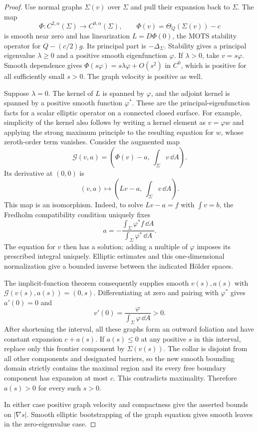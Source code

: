 \begin{proof}
Use normal graphs $\Sigma(v)$ over $\Sigma$ and pull their expansion
back to $\Sigma$.  The map
\[
 \Phi:C^{2,\alpha}(\Sigma)\longrightarrow C^{0,\alpha}(\Sigma),
 \qquad
 \Phi(v)=\Theta_Q(\Sigma(v))-c
\]
is smooth near zero and has linearization $L=D\Phi(0)$, the MOTS
stability operator for $Q-(c/2)g$.  Its principal part is
$-\Delta_\Sigma$.  Stability gives a principal eigenvalue
$\lambda\geq0$ and a positive smooth eigenfunction $\varphi$.
If $\lambda>0$, take $v=s\varphi$.  Smooth dependence gives
$\Phi(s\varphi)=s\lambda\varphi+O(s^2)$ in $C^0$, which is
positive for all sufficiently small $s>0$.  The graph velocity is
positive as well.

Suppose $\lambda=0$.  The kernel of $L$ is spanned by $\varphi$,
and the adjoint kernel is spanned by a positive smooth function
$\varphi^*$.  These are the principal-eigenfunction facts for a
scalar elliptic operator on a connected closed surface.  For
example, simplicity of the kernel also follows by writing a kernel
element as $v=\varphi w$ and applying the strong maximum principle
to the resulting equation for $w$, whose zeroth-order term vanishes.
Consider the augmented map
\[
 \mathcal G(v,a)
   =\left(\Phi(v)-a,\ \int_\Sigma v\,\dd A\right).
\]
Its derivative at $(0,0)$ is
\begin{equation}\label{n3:domains:augmented-linearization}
 (v,a)\longmapsto
 \left(Lv-a,\ \int_\Sigma v\,\dd A\right).
\end{equation}
This map is an isomorphism.  Indeed, to solve $Lv-a=f$ with
$\int v=b$, the Fredholm compatibility condition uniquely fixes
\[
 a=-\frac{\int_\Sigma\varphi^*f\,\dd A}
          {\int_\Sigma\varphi^*\,\dd A}.
\]
The equation for $v$ then has a solution; adding a multiple of
$\varphi$ imposes its prescribed integral uniquely.  Elliptic
estimates and this one-dimensional normalization give a bounded
inverse between the indicated H\"older spaces.

The implicit-function theorem consequently supplies smooth
$v(s),a(s)$ with $\mathcal G(v(s),a(s))=(0,s)$.  Differentiating at
zero and pairing with $\varphi^*$ gives $a'(0)=0$ and
\[
 v'(0)=\frac{\varphi}{\int_\Sigma\varphi\,\dd A}>0.
\]
After shortening the interval, all these graphs form an outward
foliation and have constant expansion $c+a(s)$.  If $a(s)\leq0$
at any positive $s$ in this interval, replace only this frontier
component by $\Sigma(v(s))$.  The collar is disjoint from all other
components and designated barriers, so the new smooth bounding
domain strictly contains the maximal region and its every free
boundary component has expansion at most $c$.  This contradicts
maximality.  Therefore $a(s)>0$ for every such $s>0$.

In either case positive graph velocity and compactness give the
asserted bounds on $|\nabla s|$.  Smooth elliptic bootstrapping of
the graph equation gives smooth leaves in the zero-eigenvalue case.
\end{proof}


